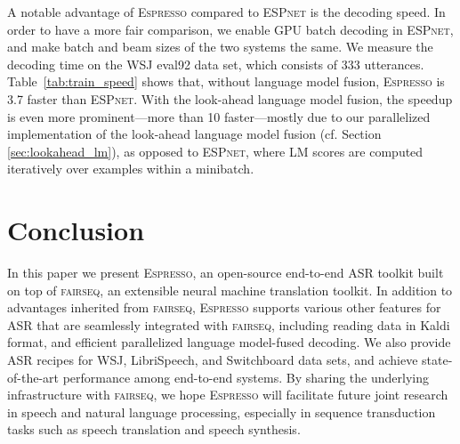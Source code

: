 \documentclass{article}
\def\espresso{\textsc{Espresso}\xspace}
\def\fairseq{\textsc{fairseq}\xspace}
\def\espnet{\textsc{ESPnet}\xspace}
\begin{document}
A notable advantage of \espresso compared to \espnet is the decoding speed. In order to have a more fair comparison, we enable GPU batch decoding in \espnet \cite{seki2018vectorization}, and make batch and beam sizes of the two systems the same. We measure the decoding time on the WSJ eval92 data set, which consists of 333 utterances. Table~\ref{tab:train_speed} shows that, without language model fusion, \espresso is 3.7 faster than \espnet. With the look-ahead language model fusion, the speedup is even more prominent---more than 10 faster---mostly due to our parallelized implementation of the look-ahead language model fusion (cf. Section \ref{sec:lookahead_lm}), as opposed to \espnet, where LM scores are computed iteratively over examples within a minibatch.



\section{Conclusion}
\label{sec:print}
In this paper we present \espresso, an open-source end-to-end ASR toolkit built on top of \fairseq, an extensible neural machine translation toolkit. In addition to advantages inherited from \fairseq, \espresso supports various other features for ASR that are seamlessly integrated with \fairseq, including reading data in Kaldi format, and efficient parallelized language model-fused decoding. We also provide ASR recipes for WSJ, LibriSpeech, and Switchboard data sets, and achieve state-of-the-art performance among end-to-end systems. By sharing the underlying infrastructure with \fairseq, we hope \espresso will facilitate future joint research in speech and natural language processing, especially in sequence transduction tasks such as speech translation and speech synthesis. 



\end{document}
